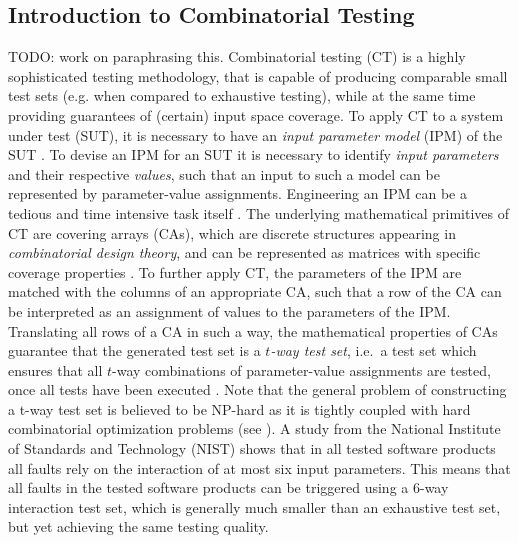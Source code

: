 \documentclass[conference]{IEEEtran}
\newcommand{\todo}[1]{}
\renewcommand{\todo}[1]{{\color{red} TODO: {#1}}}
\begin{document}
	\subsection{Introduction to Combinatorial Testing}
	\todo{work on paraphrasing this}.
	Combinatorial testing (CT) is a highly sophisticated testing methodology,
	that is capable of producing comparable small test sets (e.g. when compared to exhaustive testing),
	while at the same time providing guarantees of (certain) input space coverage.
	To apply CT to a system under test (SUT), it is necessary to have an \emph{input parameter model} (IPM) of the SUT \cite{OffuttIPM}.
	To devise an IPM for an SUT it is necessary to identify \emph{input parameters} and their respective \emph{values},
	such that an input to such a model can be represented by parameter-value assignments.
	Engineering an IPM can be a tedious and time intensive task itself \cite{rework}.
	The underlying mathematical primitives of CT are covering arrays (CAs), which are discrete structures appearing in \emph{combinatorial design theory},
	and can be represented as matrices with specific coverage properties \cite{NISTpractical}.
	To further apply CT, the parameters of the IPM are matched with the columns of an appropriate CA,
	such that a row of the CA can be interpreted as an assignment of values to the parameters of the IPM.
	Translating all rows of a CA in such a way, the mathematical properties of CAs guarantee that the generated test set
	is a \emph{$t$-way test set}, i.e.\ a test set which ensures that all $t$-way combinations of parameter-value assignments are tested,
	once all tests have been executed \cite{NISTpractical}. Note that the general problem of constructing a t-way test set is believed to be NP-hard as it is tightly coupled with hard combinatorial optimization problems (see \cite{CHENG20071943}).
	A study from the National Institute of Standards and Technology (NIST) \cite{NISTpractical} shows
	that in all tested software products all faults rely on the interaction of at most six input parameters.
	This means that all faults in the tested software products can be triggered using a $6$-way interaction test set,
	which is generally much smaller than an exhaustive test set, but yet achieving the same testing quality.
\end{document}
